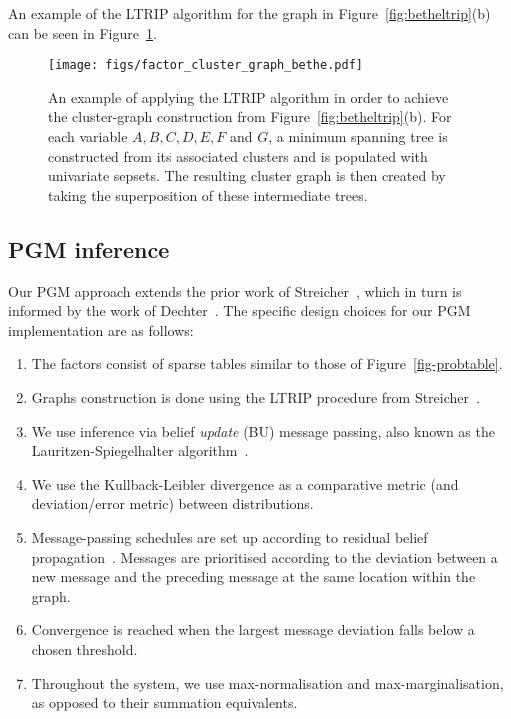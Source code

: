 \documentclass{ieeeaccess}
\begin{document}
An example of the LTRIP algorithm for the graph in Figure~\ref{fig:betheltrip}(b) can be seen in Figure~\ref{fig:ltrip_construction}.
\begin{figure}[h]
	\centering
	\texttt{[image: figs/factor\_cluster\_graph\_bethe.pdf]}
	\caption{An example of applying the LTRIP algorithm in order to achieve the cluster-graph construction from Figure~\ref{fig:betheltrip}(b). For each variable $A, B, C, D, E, F$ and $G$, a minimum spanning tree is constructed from its associated clusters and is populated with univariate sepsets. The resulting cluster graph is then created by taking the superposition of these intermediate trees.}
	\label{fig:ltrip_construction}
\end{figure}



\subsection{PGM inference}\label{sec:basig_pgm}
Our PGM approach extends the prior work of Streicher~\cite{streicher}, which in turn is informed by the work of Dechter~\cite{dechter2010on}. The specific design choices for our PGM implementation are as follows:
\begin{enumerate}
	\item
	The factors consist of sparse tables similar to those of Figure~\ref{fig-probtable}.
	
	\item
	Graphs construction is done using the LTRIP procedure from Streicher~\cite{streicher}.
	
	\item
	We use inference via belief \emph{update} (BU) message passing, also known as the Lauritzen-Spiegelhalter algorithm~\cite{lauritzen1988local}.
	
	\item
	We use the Kullback-Leibler divergence as a comparative
	metric (and deviation/error metric) between distributions.
	
	\item
	Message-passing schedules are set up according to residual belief propagation~\cite{elidan2012residual}. Messages are prioritised according to the deviation between a new message and the preceding message at the
	same location within the graph.
	
	\item
	Convergence is reached when the largest message deviation falls below a chosen threshold.
	
	\item
	Throughout the system, we use max-normalisation and max-marginalisation, as opposed to their summation equivalents.
\end{enumerate}
\end{document}
